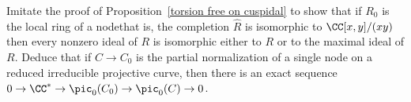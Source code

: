 \begin{exercise}\label{linear series on a nodal curve}
Imitate the proof of Proposition~\ref{torsion free on cuspidal} to
show that if $R_{0}$ is the local ring of a node\emdash that is, the
completion $\widehat R$ is isomorphic to $\CC[x,y]/(xy)$\emdash then
every nonzero ideal of $R$ is isomorphic
either to $R$ or to the maximal ideal of $R$. Deduce that if $C\to C_{0}$
is the
partial normalization of a single node on a reduced irreducible projective
curve, then there is an exact sequence
$0\to \CC^{*} \to \pic_{0}(C_{0}) \to \pic_{0}(C) \to 0$.
\end{exercise}

